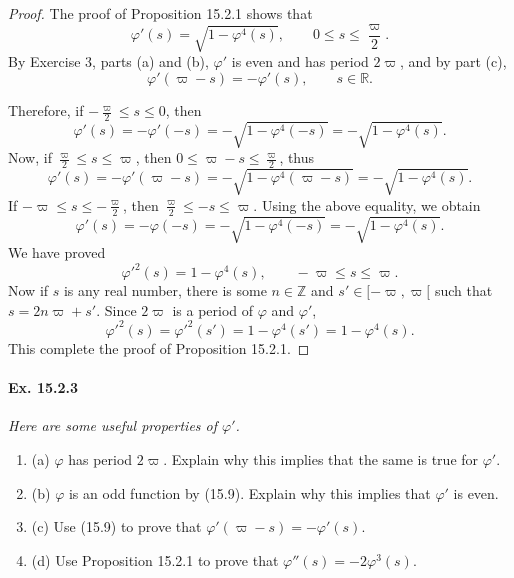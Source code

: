 \documentclass[11pt,a4paper]{article}
\newcommand{\be} {\begin{enumerate}}
\newcommand{\ee} {\end{enumerate}}
\newcommand{\Z}{\mathbb{Z}}
\newcommand{\R}{\mathbb{R}}
\begin{document}
\begin{proof}
The proof of Proposition 15.2.1 shows that
$$\varphi'(s)  = \sqrt{1 - \varphi^4(s)},\qquad 0 \leq s \leq \frac{\varpi}{2}.$$
By Exercise 3, parts (a) and (b), $\varphi'$ is even and has period $2 \varpi$, and by part (c),
$$\varphi'(\varpi - s) = - \varphi'(s), \qquad s \in \R.$$

Therefore, if $-\frac{\varpi}{2} \leq s \leq 0$, then
$$\varphi'(s) = - \varphi'(-s) =  -\sqrt{1 - \varphi^4(-s)} = - \sqrt{1 - \varphi^4(s)}.$$
Now, if $\frac{\varpi}{2} \leq s \leq \varpi$, then $0 \leq \varpi -s \leq \frac{\varpi}{2}$, thus 
$$\varphi'(s) = -\varphi'(\varpi - s) = -\sqrt{1 - \varphi^4(\varpi - s)} = - \sqrt{1 - \varphi^4(s)}.$$
If $-\varpi \leq s \leq -\frac{\varpi}{2}$, then $\frac{\varpi}{2} \leq -s  \leq \varpi$. Using the above equality, we obtain
$$\varphi'(s) = - \varphi(-s) = -  \sqrt{1 - \varphi^4(-s)} = - \sqrt{1 - \varphi^4(s)}.$$
We have proved
$$\varphi'^2(s) = 1 - \varphi^4(s), \qquad -\varpi \leq s \leq \varpi. $$
Now if $s$ is any real number, there is some $n\in \Z$ and $s' \in [-\varpi, \varpi[$ such that $s = 2n \varpi + s'$. Since $2\varpi$ is a period of $\varphi$ and $\varphi'$,
$$\varphi'^2(s) = \varphi'^2(s') = 1 -\varphi^4(s') = 1 - \varphi^4(s).$$
This complete the proof of Proposition 15.2.1.
\end{proof}

\paragraph{Ex. 15.2.3}{\it Here are some useful properties of $\varphi'$.
\be
\item[(a)] $\varphi$ has period $2\varpi$. Explain why this implies that the same is true for $\varphi'$.
\item[(b)] $\varphi$ is an odd function by (15.9). Explain why this implies that $\varphi'$ is even.
\item[(c)] Use (15.9) to prove that $\varphi'(\varpi -s) =  - \varphi'(s)$.
\item[(d)] Use Proposition 15.2.1 to prove that $\varphi''(s) = -2 \varphi^3(s)$.
\ee
}
\end{document}
